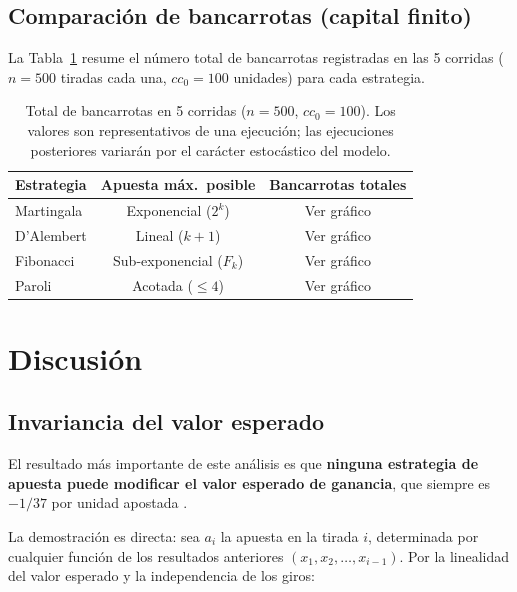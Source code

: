 \documentclass[a4paper, 11pt]{article}
\begin{document}
\subsection{Comparación de bancarrotas (capital finito)}

La Tabla~\ref{tab:bancarrotas} resume el número total de bancarrotas
registradas en las 5 corridas ($n = 500$ tiradas cada una, $cc_0 = 100$
unidades) para cada estrategia.

\begin{table}[H]
  \centering
  \caption{Total de bancarrotas en 5 corridas ($n = 500$, $cc_0 = 100$).
    Los valores son representativos de una ejecución; las ejecuciones
    posteriores variarán por el carácter estocástico del modelo.}
  \label{tab:bancarrotas}
  \begin{tabular}{lcc}
    \toprule
    \textbf{Estrategia} & \textbf{Apuesta máx.\ posible} & \textbf{Bancarrotas totales} \\
    \midrule
    Martingala   & Exponencial ($2^k$) & Ver gráfico \\
    D'Alembert   & Lineal ($k + 1$)    & Ver gráfico \\
    Fibonacci    & Sub-exponencial ($F_k$) & Ver gráfico \\
    Paroli       & Acotada ($\leq 4$)  & Ver gráfico \\
    \bottomrule
  \end{tabular}
\end{table}

\section{Discusión}

\subsection{Invariancia del valor esperado}

El resultado más importante de este análisis es que \textbf{ninguna
estrategia de apuesta puede modificar el valor esperado de ganancia},
que siempre es $-1/37$ por unidad apostada
\cite{walpole2012probabilidad, devore2016probabilidad}.

La demostración es directa: sea $a_i$ la apuesta en la tirada $i$,
determinada por cualquier función de los resultados anteriores
$(x_1, x_2, \ldots, x_{i-1})$. Por la linealidad del valor esperado
y la independencia de los giros:
\end{document}

